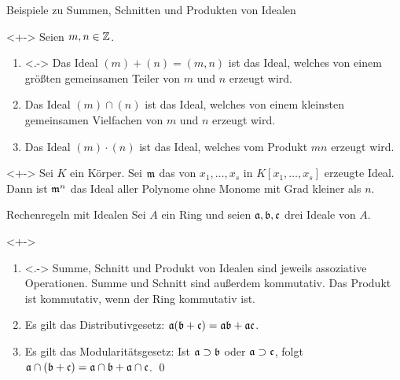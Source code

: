 \begin{frame}{Beispiele zu Summen, Schnitten und Produkten von Idealen}
    \begin{example}<+->
        Seien \(m, n \in \mathbb Z\).
        \begin{enumerate}[<+->]
        \item<.->
            Das Ideal \((m) + (n) = (m, n)\) ist das Ideal, welches
            von einem größten gemeinsamen Teiler von \(m\) und \(n\) erzeugt wird.
        \item
            Das Ideal \((m) \cap (n)\) ist das Ideal, welches von einem kleinsten   
            gemeinsamen Vielfachen von \(m\) und \(n\) erzeugt wird.
        \item
            Das Ideal \((m) \cdot (n)\) ist das Ideal, welches vom Produkt \(mn\)
            erzeugt wird.
        \end{enumerate}
    \end{example}
    \begin{example}<+->
        Sei \(K\) ein Körper. Sei \(\mathfrak{m}\) das von \(x_1, \dotsc, x_s\) in
        \(K[x_1, \dotsc, x_s]\) erzeugte Ideal. Dann ist \(\mathfrak{m}^n\) das Ideal
        aller Polynome ohne Monome mit Grad kleiner als \(n\).
    \end{example}
\end{frame}

\begin{frame}{Rechenregeln mit Idealen}
    Sei \(A\) ein Ring und seien \(\mathfrak{a}, \mathfrak{b}, \mathfrak{c}\) drei Ideale
    von \(A\).
    \begin{proposition}<+->
        \begin{enumerate}[<+->]
        \item<.->
            Summe, Schnitt und Produkt von Idealen sind
            jeweils assoziative Operationen. Summe und Schnitt sind
            außerdem kommutativ. Das Produkt ist kommutativ, wenn der Ring
            kommutativ ist.
        \item
            Es gilt das Distributivgesetz: \(\mathfrak{a} (\mathfrak{b} + \mathfrak{c})
            = \mathfrak{a} \mathfrak{b} + \mathfrak{a} \mathfrak{c}\).
        \item
            Es gilt das Modularitätsgesetz: Ist \(\mathfrak{a} \supset \mathfrak{b}\)
            oder \(\mathfrak{a} \supset \mathfrak{c}\), folgt
            \(\mathfrak{a} \cap (\mathfrak{b} + \mathfrak{c})
            = \mathfrak{a} \cap \mathfrak{b} + \mathfrak{a} \cap \mathfrak{c}\).
            \qed
        \end{enumerate}
    \end{proposition}
\end{frame}

